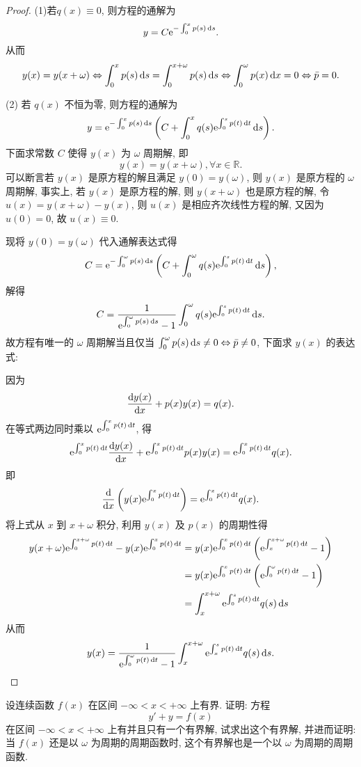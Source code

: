 \begin{proof}
  (1)若$q(x)\equiv0$, 则方程的通解为
  \[y=C\mathrm{e}^{-\int_0^xp(s)\mathop{}\!\mathrm{d} s}.\]
  从而
  \[y(x)=y(x+\omega)\Leftrightarrow\int_0^xp(s)\mathop{}\!\mathrm{d} s
    = \int_0^{x+\omega}p(s)\mathop{}\!\mathrm{d} s
  \Leftrightarrow\int_0^{\omega}p(x)\mathop{}\!\mathrm{d} x=0\Leftrightarrow\bar{p} = 0.\]

  (2) 若 $q(x)$ 不恒为零, 则方程的通解为
  \[y=\mathrm{e}^{-\int_0^xp(s)\mathop{}\!\mathrm{d} s}\left(C+\int_0^x q(s)\mathrm{e}^{\int_0^s p(t)\mathop{}\!\mathrm{d} t}\mathop{}\!\mathrm{d} s\right).\]
  下面求常数 $C$ 使得 $y(x)$ 为 $\omega$ 周期解, 即
  \[y(x)=y(x+\omega),\forall x\in\mathbb{R}.\]
  可以断言若 $y(x)$ 是原方程的解且满足 $y(0)=y(\omega)$, 则 $y(x)$ 是原方程的 $\omega$ 周期解, 
  事实上, 若 $y(x)$ 是原方程的解, 则 $y(x+\omega)$ 也是原方程的解, 
  令 $u(x)=y(x+\omega)-y(x)$, 则 $u(x)$ 是相应齐次线性方程的解, 又因为 $u(0)=0$, 故 $u(x)\equiv0 $.

  现将 $y(0)=y(\omega)$ 代入通解表达式得
  \[C = \mathrm{e}^{-\int_0^{\omega}p(s)\mathop{}\!\mathrm{d} s}\left(C+\int_0^{\omega}q(s)
    \mathrm{e}^{\int_0^sp(t)\mathop{}\!\mathrm{d} t}\mathop{}\!\mathrm{d} s\right),\]
  解得
  \[C = \frac{1}{\mathrm{e}^{\int_0^{\omega}p(s)\mathop{}\!\mathrm{d} s}-1}\int_0^{\omega}q(s)\mathrm{e}^{\int_0^sp(t)\mathop{}\!\mathrm{d} t}\mathop{}\!\mathrm{d} s.\]
  故方程有唯一的 $\omega$ 周期解当且仅当 $\int_0^{\omega}p(s)\mathop{}\!\mathrm{d} s\neq0\Leftrightarrow\bar{p}\neq 0$,
  下面求 $y(x)$ 的表达式:

  因为
  \[\frac{\mathop{}\!\mathrm{d} y(x)}{\mathop{}\!\mathrm{d} x}+p(x)y(x)=q(x).\]
  在等式两边同时乘以 $\mathrm{e}^{\int_0^x p(t)\mathop{}\!\mathrm{d} t}$, 得
  \[\mathrm{e}^{\int_0^xp(t)\mathop{}\!\mathrm{d} t}\frac{\mathop{}\!\mathrm{d} y(x)}{\mathop{}\!\mathrm{d} x}+\mathrm{e}^{\int_0^xp(t)\mathop{}\!\mathrm{d} t}p(x)y(x)
    = \mathrm{e}^{\int_0^xp(t)\mathop{}\!\mathrm{d} t}q(x).\]
  即
  \[\frac{\mathop{}\!\mathrm{d}}{\mathop{}\!\mathrm{d} x}\left(y(x)\mathrm{e}^{\int_0^xp(t)\mathop{}\!\mathrm{d} t}\right)=\mathrm{e}^{\int_0^xp(t)\mathop{}\!\mathrm{d} t}q(x).\]
  将上式从 $x$ 到 $x+\omega$ 积分, 利用 $y(x)$ 及 $p(x)$ 的周期性得
  \[\begin{split}
  y(x+\omega)\e^{\int_0^{x+\omega}p(t)\diff t}-y(x)\e^{\int_0^xp(t)\diff t}
  & = y(x)\e^{\int_0^xp(t)\diff t}\left(\e^{\int_x^{x+\omega}p(t)\diff t}-1\right) \\
  & = y(x)\e^{\int_0^xp(t)\diff t}\left(\e^{\int_0^{\omega}p(t)\diff t}-1\right) \\
  & = \int_x^{x+\omega}\e^{\int_0^sp(t)\diff t}q(s)\diff s
  \end{split}\]
  从而
  \[y(x)=\frac{1}{\mathrm{e}^{\int_0^{\omega}p(t)\mathop{}\!\mathrm{d} t}-1}
    \int_x^{x+\omega}\mathrm{e}^{\int_x^sp(t)\mathop{}\!\mathrm{d} t}q(s)\mathop{}\!\mathrm{d} s.\qedhere\]
\end{proof}



\begin{exercise}
  设连续函数 $f(x)$ 在区间 $-\infty<x<+\infty$ 上有界. 证明: 方程
  \[y'+y=f(x)\]
  在区间 $-\infty<x<+\infty$ 上有并且只有一个有界解, 试求出这个有界解, 并进而证明:
  当 $f(x)$ 还是以 $\omega$ 为周期的周期函数时, 这个有界解也是一个以 $\omega$ 为周期的周期函数.
\end{exercise}

